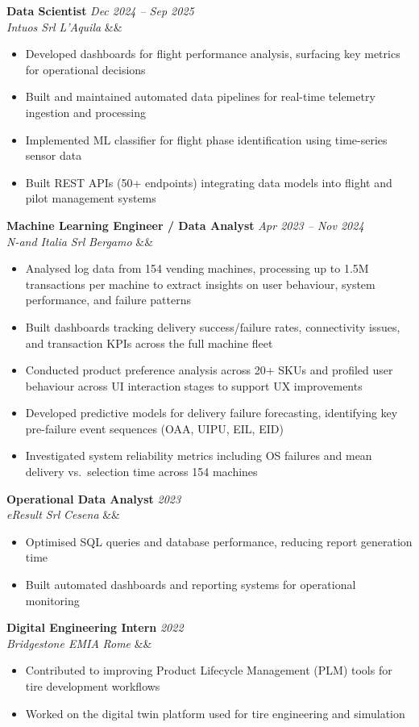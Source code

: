 \documentclass[10pt,a4paper]{article}
\newcommand{\cventry}[5]{%
  \noindent\textbf{#1} \hfill \textit{#2}\\
  \textit{#3} \hfill \textit{#4}%
  \ifx&#5&\else\\\textit{#5}\fi
  \vspace{2pt}
}
\begin{document}
\medskip
\cventry{Data Scientist}{Dec 2024 -- Sep 2025}{Intuos Srl}{L'Aquila}{}
\begin{itemize}
  \item Developed dashboards for flight performance analysis, surfacing key metrics for operational decisions
  \item Built and maintained automated data pipelines for real-time telemetry ingestion and processing
  \item Implemented ML classifier for flight phase identification using time-series sensor data
  \item Built REST APIs (50+ endpoints) integrating data models into flight and pilot management systems
\end{itemize}

\medskip
\cventry{Machine Learning Engineer / Data Analyst}{Apr 2023 -- Nov 2024}{N-and Italia Srl}{Bergamo}{}
\begin{itemize}
  \item Analysed log data from 154 vending machines, processing up to 1.5M transactions per machine to extract insights on user behaviour, system performance, and failure patterns
  \item Built dashboards tracking delivery success/failure rates, connectivity issues, and transaction KPIs across the full machine fleet
  \item Conducted product preference analysis across 20+ SKUs and profiled user behaviour across UI interaction stages to support UX improvements
  \item Developed predictive models for delivery failure forecasting, identifying key pre-failure event sequences (OAA, UIPU, EIL, EID)
  \item Investigated system reliability metrics including OS failures and mean delivery vs.\ selection time across 154 machines
\end{itemize}

\medskip
\cventry{Operational Data Analyst}{2023}{eResult Srl}{Cesena}{}
\begin{itemize}
  \item Optimised SQL queries and database performance, reducing report generation time
  \item Built automated dashboards and reporting systems for operational monitoring
\end{itemize}

\medskip
\cventry{Digital Engineering Intern}{2022}{Bridgestone EMIA}{Rome}{}
\begin{itemize}
  \item Contributed to improving Product Lifecycle Management (PLM) tools for tire development workflows
  \item Worked on the digital twin platform used for tire engineering and simulation
\end{itemize}
\end{document}
